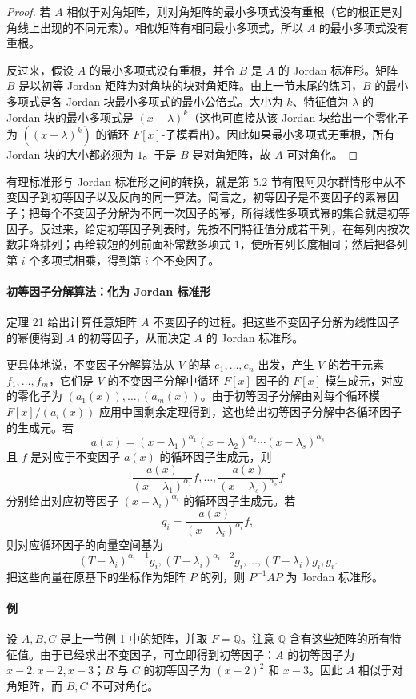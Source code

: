 \begin{proof}
若 $A$ 相似于对角矩阵，则对角矩阵的最小多项式没有重根（它的根正是对角线上出现的不同元素）。相似矩阵有相同最小多项式，所以 $A$ 的最小多项式没有重根。

反过来，假设 $A$ 的最小多项式没有重根，并令 $B$ 是 $A$ 的 Jordan 标准形。矩阵 $B$ 是以初等 Jordan 矩阵为对角块的块对角矩阵。由上一节末尾的练习，$B$ 的最小多项式是各 Jordan 块最小多项式的最小公倍式。大小为 $k$、特征值为 $\lambda$ 的 Jordan 块的最小多项式是 $(x-\lambda)^k$（这也可直接从该 Jordan 块给出一个零化子为 $((x-\lambda)^k)$ 的循环 $F[x]$-子模看出）。因此如果最小多项式无重根，所有 Jordan 块的大小都必须为 $1$。于是 $B$ 是对角矩阵，故 $A$ 可对角化。
\end{proof}

有理标准形与 Jordan 标准形之间的转换，就是第 5.2 节有限阿贝尔群情形中从不变因子到初等因子以及反向的同一算法。简言之，初等因子是不变因子的素幂因子；把每个不变因子分解为不同一次因子的幂，所得线性多项式幂的集合就是初等因子。反过来，给定初等因子列表时，先按不同特征值分成若干列，在每列内按次数非降排列；再给较短的列前面补常数多项式 $1$，使所有列长度相同；然后把各列第 $i$ 个多项式相乘，得到第 $i$ 个不变因子。

\paragraph{初等因子分解算法：化为 Jordan 标准形}
定理 21 给出计算任意矩阵 $A$ 不变因子的过程。把这些不变因子分解为线性因子的幂便得到 $A$ 的初等因子，从而决定 $A$ 的 Jordan 标准形。

更具体地说，不变因子分解算法从 $V$ 的基 $e_1,\ldots,e_n$ 出发，产生 $V$ 的若干元素 $f_1,\ldots,f_m$，它们是 $V$ 的不变因子分解中循环 $F[x]$-因子的 $F[x]$-模生成元，对应的零化子为 $(a_1(x)),\ldots,(a_m(x))$。由于初等因子分解由对每个循环模 $F[x]/(a_i(x))$ 应用中国剩余定理得到，这也给出初等因子分解中各循环因子的生成元。若
\[
a(x)=(x-\lambda_1)^{\alpha_1}(x-\lambda_2)^{\alpha_2}\cdots(x-\lambda_s)^{\alpha_s}
\]
且 $f$ 是对应于不变因子 $a(x)$ 的循环因子生成元，则
\[
\frac{a(x)}{(x-\lambda_1)^{\alpha_1}}f,
\ldots,
\frac{a(x)}{(x-\lambda_s)^{\alpha_s}}f
\]
分别给出对应初等因子 $(x-\lambda_i)^{\alpha_i}$ 的循环因子生成元。若
\[
g_i=\frac{a(x)}{(x-\lambda_i)^{\alpha_i}}f,
\]
则对应循环因子的向量空间基为
\[
(T-\lambda_i)^{\alpha_i-1}g_i,
(T-\lambda_i)^{\alpha_i-2}g_i,
\ldots,
(T-\lambda_i)g_i,g_i.
\]
把这些向量在原基下的坐标作为矩阵 $P$ 的列，则 $P^{-1}AP$ 为 Jordan 标准形。

\paragraph{例}
设 $A,B,C$ 是上一节例 1 中的矩阵，并取 $F=\mathbb Q$。注意 $\mathbb Q$ 含有这些矩阵的所有特征值。由于已经求出不变因子，可立即得到初等因子：$A$ 的初等因子为 $x-2,x-2,x-3$；$B$ 与 $C$ 的初等因子为 $(x-2)^2$ 和 $x-3$。因此 $A$ 相似于对角矩阵，而 $B,C$ 不可对角化。

